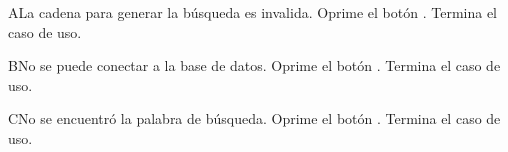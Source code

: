 		\begin{UCtrayectoriaA}{A}{La cadena para generar la búsqueda es invalida.}
			\UCpaso[\UCactor] Oprime el botón .
			\UCpaso[\UCsist] Termina el caso de uso.
		\end{UCtrayectoriaA}
		\begin{UCtrayectoriaA}{B}{No se puede conectar a la base de datos.}
			\UCpaso[\UCactor] Oprime el botón .
			\UCpaso[\UCsist] Termina el caso de uso.
		\end{UCtrayectoriaA}
		\begin{UCtrayectoriaA}{C}{No se encuentró la palabra de búsqueda.}
			\UCpaso[\UCactor] Oprime el botón .
			\UCpaso[\UCsist] Termina el caso de uso.
		\end{UCtrayectoriaA}
		
